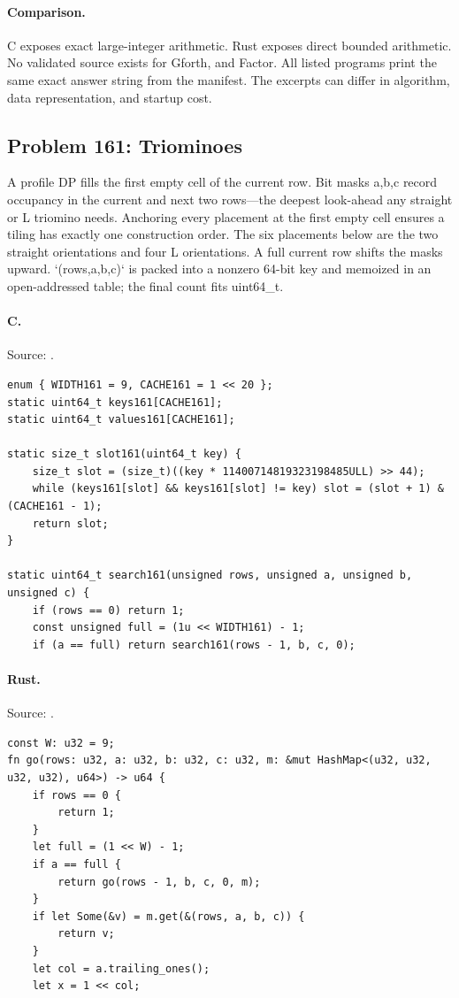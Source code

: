 \paragraph{Comparison.}
C exposes exact large-integer arithmetic. Rust exposes direct bounded arithmetic.
No validated source exists for Gforth, and Factor.
All listed programs print the same exact answer string from the manifest. The excerpts can differ in algorithm, data representation, and startup cost.

\subsection{Problem 161: Triominoes}
\label{walkthrough:p161}
A profile DP fills the first empty cell of the current row. Bit masks a,b,c record occupancy in the current and next two rows—the deepest look-ahead any straight or L triomino needs. Anchoring every placement at the first empty cell ensures a tiling has exactly one construction order. The six placements below are the two straight orientations and four L orientations. A full current row shifts the masks upward. `(rows,a,b,c)` is packed into a nonzero 64-bit key and memoized in an open-addressed table; the final count fits uint64\_t.

\paragraph{C.} Source: .
\begin{lstlisting}
enum { WIDTH161 = 9, CACHE161 = 1 << 20 };
static uint64_t keys161[CACHE161];
static uint64_t values161[CACHE161];

static size_t slot161(uint64_t key) {
    size_t slot = (size_t)((key * 11400714819323198485ULL) >> 44);
    while (keys161[slot] && keys161[slot] != key) slot = (slot + 1) & (CACHE161 - 1);
    return slot;
}

static uint64_t search161(unsigned rows, unsigned a, unsigned b, unsigned c) {
    if (rows == 0) return 1;
    const unsigned full = (1u << WIDTH161) - 1;
    if (a == full) return search161(rows - 1, b, c, 0);
\end{lstlisting}

\paragraph{Rust.} Source: .
\begin{lstlisting}
const W: u32 = 9;
fn go(rows: u32, a: u32, b: u32, c: u32, m: &mut HashMap<(u32, u32, u32, u32), u64>) -> u64 {
    if rows == 0 {
        return 1;
    }
    let full = (1 << W) - 1;
    if a == full {
        return go(rows - 1, b, c, 0, m);
    }
    if let Some(&v) = m.get(&(rows, a, b, c)) {
        return v;
    }
    let col = a.trailing_ones();
    let x = 1 << col;
\end{lstlisting}

